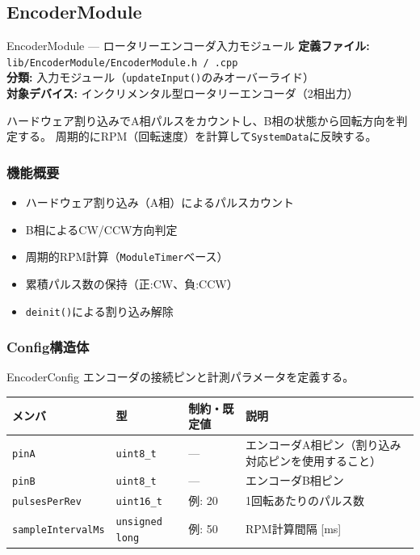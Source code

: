 \subsection{EncoderModule}

\begin{apibox}{EncoderModule --- ロータリーエンコーダ入力モジュール}
\textbf{定義ファイル:} \texttt{lib/EncoderModule/EncoderModule.h / .cpp}\\
\textbf{分類:} 入力モジュール（\texttt{updateInput()}のみオーバーライド）\\
\textbf{対象デバイス:} インクリメンタル型ロータリーエンコーダ（2相出力）

ハードウェア割り込みでA相パルスをカウントし、B相の状態から回転方向を判定する。
周期的にRPM（回転速度）を計算して\texttt{SystemData}に反映する。
\end{apibox}

\subsubsection{機能概要}

\begin{itemize}
    \item ハードウェア割り込み（A相）によるパルスカウント
    \item B相によるCW/CCW方向判定
    \item 周期的RPM計算（\texttt{ModuleTimer}ベース）
    \item 累積パルス数の保持（正:CW、負:CCW）
    \item \texttt{deinit()}による割り込み解除
\end{itemize}

\subsubsection{Config構造体}

\begin{funcblock}{EncoderConfig}
エンコーダの接続ピンと計測パラメータを定義する。

\begin{longtable}{l l l p{4.8cm}}
\toprule
\textbf{メンバ} & \textbf{型} & \textbf{制約・既定値} & \textbf{説明} \\
\midrule
\endhead
\texttt{pinA}             & \texttt{uint8\_t}       & ---       & エンコーダA相ピン（割り込み対応ピンを使用すること） \\
\texttt{pinB}             & \texttt{uint8\_t}       & ---       & エンコーダB相ピン \\
\texttt{pulsesPerRev}     & \texttt{uint16\_t}      & 例: 20    & 1回転あたりのパルス数 \\
\texttt{sampleIntervalMs} & \texttt{unsigned long}  & 例: 50    & RPM計算間隔 [ms] \\
\bottomrule
\end{longtable}
\end{funcblock}

